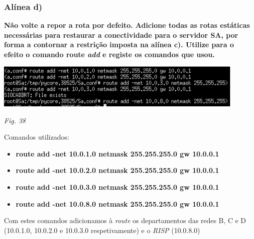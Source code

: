 \documentclass{article}
\begin{document}
\subsubsection{Alínea d)}
\textbf{Não volte a repor a rota por defeito. Adicione todas as rotas estáticas necessárias para restaurar a conectividade para o servidor SA, por forma a contornar a restrição imposta na alínea c). Utilize para o efeito o comando route \textit{add} e registe os comandos que usou.}
\begin{center}
    \includegraphics[width = 12cm]{24.png}\par\caption{\textit{Fig. 38}}
\end{center}
\hspace{0.5cm}Comandos utilizados:\begin{itemize}
    \item \textbf{route add -net 10.0.1.0 netmask 255.255.255.0 gw 10.0.0.1}
    \item \textbf{route add -net 10.0.2.0 netmask 255.255.255.0 gw 10.0.0.1}
    \item \textbf{route add -net 10.0.3.0 netmask 255.255.255.0 gw 10.0.0.1}
    \item \textbf{route add -net 10.0.8.0 netmask 255.255.255.0 gw 10.0.0.1}
\end{itemize}
\hspace{0.5cm}Com estes comandos adicionamos à \textit{route} os departamentos das redes B, C e D (10.0.1.0, 10.0.2.0 e 10.0.3.0 respetivamente) e o \textit{RISP} (10.0.8.0)\clearpage
\end{document}
